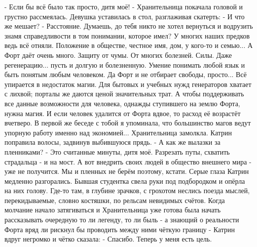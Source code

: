 - Если бы всё было так просто, дитя моё! - Хранительница покачала головой и грустно рассмеялась.
Девушка уставилась в стол, разглаживая скатерть:
- И что же мешает?
- Расстояние. Думаешь, до тебя никто не хотел вернуться и водрузить знамя справедливости в том понимании, которое имел? У многих наших предков ведь всё отняли. Положение в обществе, честное имя, дом, у кого-то и семью... А Форт даёт очень много. Защиту от чумы. От многих болезней. Силы. Даже регенерацию... пусть и долгую и болезненную. Умение понимать любой язык и быть понятым любым человеком. Да Форт и не отбирает свободы, просто... Всё упирается в недостаток магии. Для бытовых и учебных нужд генераторов хватает с лихвой; порталы же даются ценой значительных трат. А чтобы поддерживать все данные возможности для человека, однажды ступившего на землю Форта, нужна магия. И если человек удалится от Форта вдвое, то расход её возрастёт вчетверо. В первой же беседе с тобой я упоминала, что большинство магов ведут упорную работу именно над экономией...
Хранительница замолкла. Катрин поправила волосы, задвинув выбившуюся прядь.
- А как же вылазки за пленниками?
- Это считанные минуты, дитя моё. Разрезать путы, схватить страдальца - и на мост. А вот внедрить своих людей в общество внешнего мира - уже не получится. Мы и пленных не берём поэтому, кстати.
Серые глаза Катрин медленно разгорались. Бывшая студентка свела руки под подбородком и опёрла на них голову. Где-то там, в глубине зрачков, с грохотом неслись поезда мыслей, перекидываемые, словно костяшки, по рельсам невидимых счётов. Когда молчание начало затягиваться и Хранительница уже готова была начать рассказывать очередную то ли легенду, то ли быль - а знающий о реальности Форта вряд ли рискнул бы проводить между ними чёткую границу - Катрин вдруг негромко и чётко сказала:
- Спасибо. Теперь у меня есть цель.


